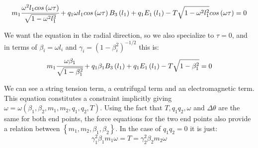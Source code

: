 \documentclass[11pt,a4paper]{article}
\begin{document}
\begin{equation}
m_{1}\cfrac{\omega^{2}l_{1}cos\left(\omega\tau\right)}{\sqrt{1-\omega^{2}l_{1}^{2}}}+q_{1}\omega l_{1}cos\left(\omega\tau\right)B_{3}\left(l_{1}\right)+q_{1}E_{1}\left(l_{1}\right)-T\sqrt{1-\omega^{2}l_{1}^{2}}cos\left(\omega\tau\right)=0
\end{equation}

We want the equation in the radial direction, so we also specialize to $\tau=0$, and in terms of $\beta_{i}=\omega l_{i}$ and $\gamma_{i}=\left(1-\beta_{i}^{2}\right)^{-1/2}$ this is:
\begin{equation}
m_{1}\cfrac{\omega\beta_{1}}{\sqrt{1-\beta_{1}^{2}}}+q_{1}\beta_{1}B_{3}\left(l_{1}\right)+q_{1}E_{1}\left(l_{1}\right)-T\sqrt{1-\beta_{1}^{2}}=0
\end{equation}

We can see a string tension term, a centrifugal term and an electromagnetic term. This equation constitutes a constraint implicitly giving $\omega=\omega\left(\beta_{1},\beta_{2},m_{1},m_{2},q_{1},q_{2},T\right)$. Using the fact that $T,q_1q_2,\omega$ and $\Delta\theta$ are the same for both end points, the force equations for the two end points also provide a relation between $\left\{ m_{1},m_{2},\beta_{1},\beta_{2}\right\}$. In the case of $q_1q_2=0$ it is just:
\begin{equation}
\label{eq:massrelation}
\gamma_{1}^{2}\beta_{1}m_{1}\omega=T=\gamma_{2}^{2}\beta_{2}m_{2}\omega
\end{equation}
\end{document}
